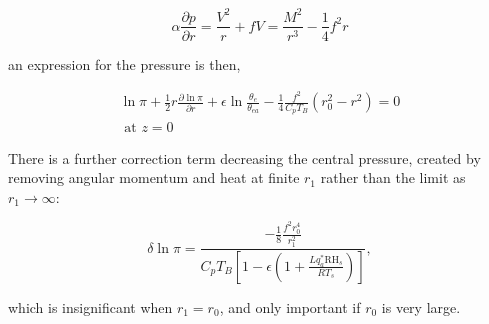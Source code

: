 \begin{equation}
\alpha \frac{\partial p}{\partial r}=\frac{V^{2}}{r}+f V=\frac{M^{2}}{r^{3}}-\frac{1}{4} f^{2} r
\end{equation}

an expression for the pressure is then,

\begin{equation}
\begin{array}{r}
\ln \pi+\frac{1}{2} r \frac{\partial \ln \pi}{\partial r}+\epsilon \ln \frac{\theta_{e}}{\theta_{e a}}-\frac{1}{4} \frac{f^{2}}{C_{p} T_{B}}\left(r_{0}^{2}-r^{2}\right)=0 \\
\text { at } z=0
\end{array}
\end{equation}

There is a further correction term decreasing the central pressure,
created by removing angular momentum and heat at finite $r_1$
rather than the limit as $r_1\to\infty$:

\begin{equation}
\delta \ln \pi=\frac{-\frac{1}{8} \frac{f^{2} r_{0}^{4}}{r_{1}^{2}}}{C_{p} T_{B}\left[1-\epsilon\left(1+\frac{L q_{a}^{*} \mathrm{RH}_{s}}{R T_{s}}\right)\right]},
\end{equation}

which is insignificant when $r_1=r_0$, and only important if $r_0$ is very large.



